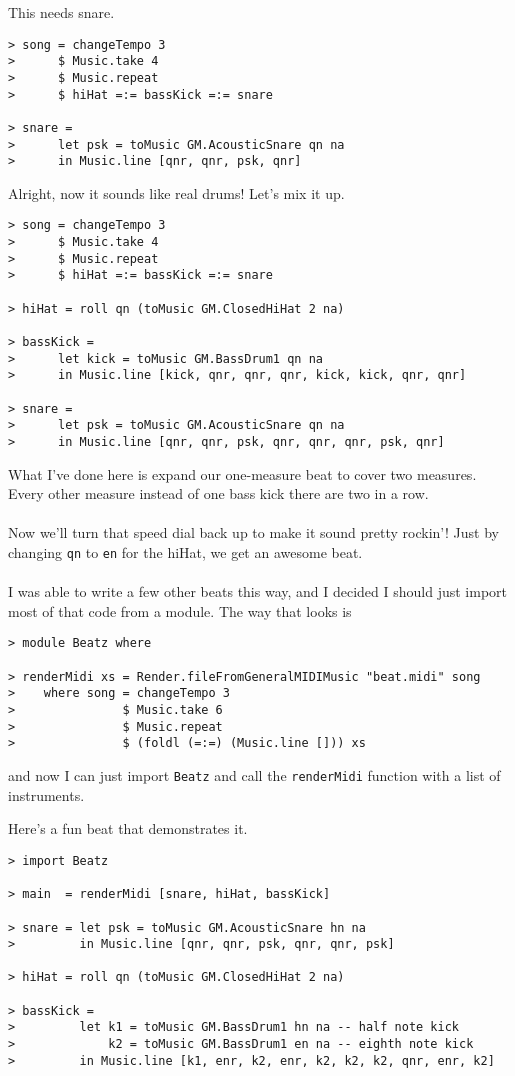 \documentclass{article}
\begin{document}
\pagebreak

\indent This needs snare.
\begin{lstlisting}
> song = changeTempo 3
>      $ Music.take 4
>      $ Music.repeat
>      $ hiHat =:= bassKick =:= snare

> snare =
>      let psk = toMusic GM.AcousticSnare qn na
>      in Music.line [qnr, qnr, psk, qnr]
\end{lstlisting}
Alright, now it sounds like real drums! Let's mix it up.
\begin{lstlisting}
> song = changeTempo 3
>      $ Music.take 4
>      $ Music.repeat
>      $ hiHat =:= bassKick =:= snare

> hiHat = roll qn (toMusic GM.ClosedHiHat 2 na)

> bassKick =
>      let kick = toMusic GM.BassDrum1 qn na
>      in Music.line [kick, qnr, qnr, qnr, kick, kick, qnr, qnr]

> snare =
>      let psk = toMusic GM.AcousticSnare qn na
>      in Music.line [qnr, qnr, psk, qnr, qnr, qnr, psk, qnr]
\end{lstlisting}
What I've done here is expand our one-measure beat to cover two measures.
Every other measure instead of one bass kick there are two in a row.\\
\\
Now we'll turn that speed dial back up to make it sound pretty rockin'! Just
by changing \lstinline{qn} to \lstinline{en} for the hiHat, we get an awesome
beat.\\
\\
I was able to write a few other beats this way, and I decided I should just import
most of that code from a module. The way that looks is
\begin{lstlisting}
> module Beatz where

> renderMidi xs = Render.fileFromGeneralMIDIMusic "beat.midi" song
>    where song = changeTempo 3
>               $ Music.take 6
>               $ Music.repeat
>               $ (foldl (=:=) (Music.line [])) xs
\end{lstlisting}
and now I can just import \lstinline{Beatz} and call the \lstinline{renderMidi}
function with a list of instruments.

\pagebreak

Here's a fun beat that demonstrates it.
\begin{lstlisting}
> import Beatz

> main  = renderMidi [snare, hiHat, bassKick]

> snare = let psk = toMusic GM.AcousticSnare hn na
>         in Music.line [qnr, qnr, psk, qnr, qnr, psk]

> hiHat = roll qn (toMusic GM.ClosedHiHat 2 na)

> bassKick =
>         let k1 = toMusic GM.BassDrum1 hn na -- half note kick                                                                                                                       
>             k2 = toMusic GM.BassDrum1 en na -- eighth note kick                                                                                                                     
>         in Music.line [k1, enr, k2, enr, k2, k2, k2, qnr, enr, k2]
\end{lstlisting}
\end{document}
